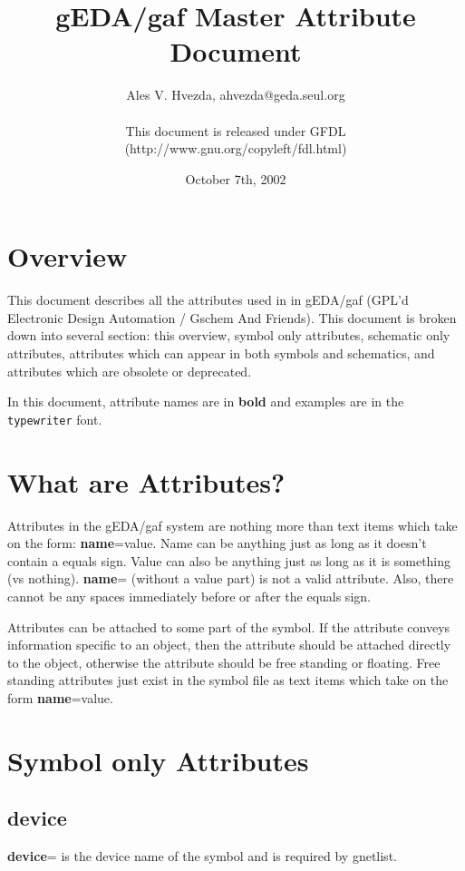 \documentclass{article}
\title{gEDA/gaf Master Attribute Document}
\author{Ales V. Hvezda, ahvezda@geda.seul.org\\
	\\
	This document is released under GFDL\\ 
	(http://www.gnu.org/copyleft/fdl.html)}
\date{October 7th, 2002}
\begin{document}
\maketitle
\newpage

\tableofcontents
\newpage


\section{Overview}

This document describes all the attributes used in in gEDA/gaf (GPL'd
Electronic Design Automation / Gschem And Friends).  This document
is broken down into several section: this overview, symbol only
attributes, schematic only attributes, attributes which can appear
in both symbols and schematics, and attributes which are obsolete or
deprecated.

In this document, attribute names are in {\bf bold} and examples
are in the \texttt{typewriter} font.

\section{What are Attributes?}

Attributes in the gEDA/gaf system are nothing more than text items
which take on the form: {\bf name}=value.  Name can be anything just as long
as it doesn't contain a equals sign.  Value can also be anything just
as long as it is something (vs nothing).  {\bf name}= (without a value part)
is not a valid attribute.  Also, there cannot be any spaces immediately
before or after the equals sign.

Attributes can be attached to some part of the symbol.  If the attribute
conveys information specific to an object, then the attribute should
be attached directly to the object, otherwise the attribute should be
free standing or floating.  Free standing attributes just exist in the
symbol file as text items which take on the form {\bf name}=value.

\newpage

\section{Symbol only Attributes}


\subsection{\bf device\label{device}}
{\bf device}= is the device name of the symbol and is required by gnetlist.  
\end{document}
